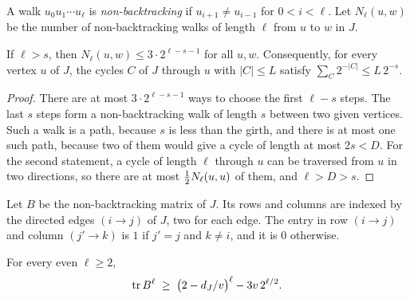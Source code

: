 A walk $u_0u_1\cdots u_\ell$ is \emph{non-backtracking} if $u_{i+1}\ne u_{i-1}$ for $0<i<\ell$. Let
$N_\ell(u,w)$ be the number of non-backtracking walks of length $\ell$ from $u$ to $w$ in $J$.

\begin{lemma}\label{lem:walks}
If $\ell>s$, then $N_\ell(u,w)\le3\cdot2^{\ell-s-1}$ for all $u,w$. Consequently, for every vertex
$u$ of $J$, the cycles $C$ of $J$ through $u$ with $|C|\le L$ satisfy $\sum_C2^{-|C|}\le L\,2^{-s}$.
\end{lemma}

\begin{proof}
There are at most $3\cdot2^{\ell-s-1}$ ways to choose the first $\ell-s$ steps. The last $s$ steps
form a non-backtracking walk of length $s$ between two given vertices. Such a walk is a path,
because $s$ is less than the girth, and there is at most one such path, because two of them would
give a cycle of length at most $2s<D$. For the second statement, a cycle of length $\ell$ through $u$
can be traversed from $u$ in two directions, so there are at most $\tfrac12 N_\ell(u,u)$ of them, and
$\ell>D>s$.
\end{proof}

Let $B$ be the non-backtracking matrix of $J$. Its rows and columns are indexed by the directed
edges $(i\to j)$ of $J$, two for each edge. The entry in row $(i\to j)$ and column $(j'\to k)$ is
$1$ if $j'=j$ and $k\ne i$, and it is $0$ otherwise.

\begin{lemma}\label{lem:spectrum}
For every even $\ell\ge2$,
\[
  \operatorname{tr} B^{\ell}\;\ge\;\bigl(2-d_J/v\bigr)^{\ell}-3v\,2^{\ell/2}.
\]
\end{lemma}

